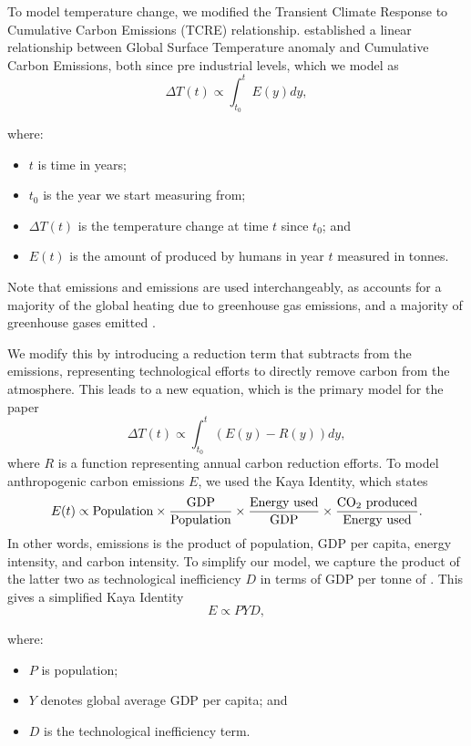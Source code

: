 \documentclass[12pt]{article}
\newcommand{\cotwo}{\text{CO\textsubscript{2}}}
\newcommand{\wherevars}[1]{
where:
\vspace{-1ex}
\begingroup
\renewcommand{\labelitemi}{-}
\begin{itemize}
    \setlength\itemsep{-0.2ex}
	#1
\end{itemize}
\endgroup
}
\begin{document}
To model temperature change, we modified the Transient Climate Response to
Cumulative Carbon Emissions (TCRE) relationship\supercite{matthews_2009}.
\citeauthor{matthews_2009} established a linear relationship between Global Surface Temperature anomaly
and Cumulative Carbon Emissions, both since pre industrial levels, which we model as
\begin{equation}
	\Delta T(t) \propto \int_{t_0}^t E(y) dy,	\label{eq:temp_emi}
\end{equation}
\wherevars{
	\item $t$ is time in years;
	\item $t_0$ is the year we start measuring from;
	\item $\Delta T(t)$ is the temperature change at time $t$ since $t_0$; and
	\item $E(t)$ is the amount of \cotwo{} produced by humans in year $t$ measured in tonnes.
}
Note that emissions and \cotwo{} emissions are used interchangeably, as \cotwo{} accounts for a majority
of the global heating due to greenhouse gas emissions,
and a majority of greenhouse gases emitted \cite{noaa_2025}.

We modify this by introducing a reduction term that subtracts from the emissions,
representing technological efforts to directly remove carbon from the atmosphere.
This leads to a new equation, which is the primary model for the paper
\begin{equation}
	\Delta T(t) \propto \int_{t_0}^t (E(y) - R(y)) dy,	\label{eq:temp_emi_rem}
\end{equation}
where $R$ is a function representing annual carbon reduction efforts.
To model anthropogenic carbon emissions $E$, we used the Kaya Identity\supercite{deutch_2017}, which states
\begin{equation*}
	E(t) \propto \text{Population} \times \frac{\text{GDP}}{\text{Population}} \times \frac{\text{Energy used}}{\text{GDP}} \times \frac{\text{\cotwo{} produced}}{\text{Energy used}}.
\end{equation*}
In other words, \cotwo{} emissions is the product of population, GDP per capita, energy intensity, and carbon intensity.
To simplify our model, we capture the product of the latter two as technological inefficiency $D$ in terms of GDP per tonne of \cotwo{}.
This gives a simplified Kaya Identity
\begin{equation}
	E \propto PYD,	\label{eq:emi_pyd}
\end{equation}
\wherevars{
	\item $P$ is population;
	\item $Y$ denotes global average GDP per capita; and
	\item $D$ is the technological inefficiency term.
}
\end{document}

